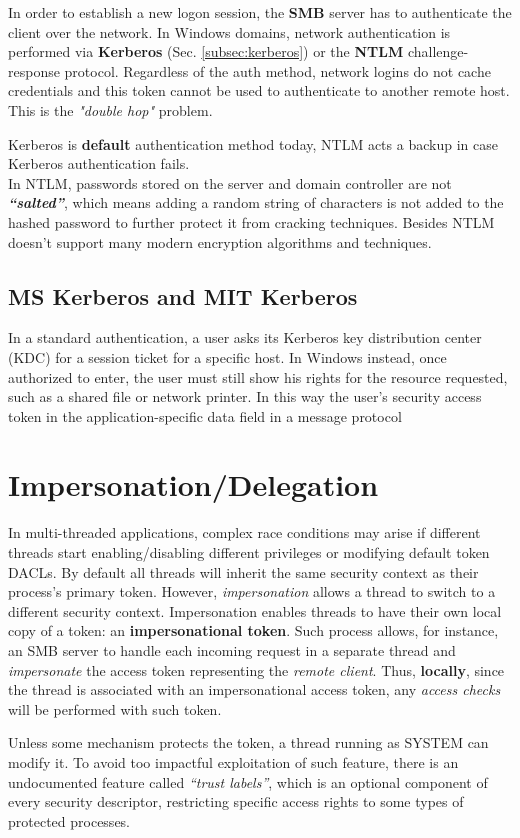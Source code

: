 In order to establish a new logon session, the \textbf{SMB} server has to authenticate the client over the network.
In Windows domains, network authentication is
performed via \textbf{Kerberos} (Sec. \ref{subsec:kerberos}) or the \textbf{NTLM} challenge-response protocol.
Regardless of the auth method, network logins do not cache credentials and this token cannot be used to
authenticate to another remote host. This is the \textit{"double hop"} problem.

Kerberos is \textbf{default} authentication method today, NTLM acts a backup in case Kerberos authentication fails.\\
In NTLM, passwords stored on the server and domain controller are not
\textit{\textbf{“salted”}}, 
which means adding a random string of characters is not added to the hashed
password to further protect it from cracking techniques.
Besides NTLM doesn't support many modern encryption algorithms and techniques.

\subsection{MS Kerberos and MIT Kerberos}
In a standard authentication, a user asks its Kerberos key distribution center (KDC) for a session ticket for a specific host.
In Windows instead, once authorized to enter, the user must
still show his rights for the resource requested, such as a shared file or
network printer.
In this way the user's security access token in the application-specific data field in a message protocol

\section{Impersonation/Delegation}
In multi-threaded applications, complex race conditions may arise if different threads start enabling/disabling different privileges or modifying default token DACLs.
By default all threads will inherit the same security context as their process’s primary token.
However, \textit{impersonation} allows a thread to switch to a different security context.
Impersonation enables threads to have their own local copy of a token: an \textbf{impersonational token}.
Such process allows, for instance, an SMB server to handle each incoming request in a separate thread and \textit{impersonate}
the access token representing the \textit{remote client}.
Thus, \textbf{locally}, since the thread is associated with an impersonational access token,
any \textit{access checks} will be performed with such token.

Unless some mechanism protects the token, a thread running as
SYSTEM can modify it.
To avoid too impactful exploitation of such feature, there is an undocumented feature called \textit{“trust labels”}, 
which is an optional component of
every security descriptor,
restricting specific access rights to
some types of protected processes.
